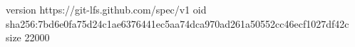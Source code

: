 version https://git-lfs.github.com/spec/v1
oid sha256:7bd6e0fa75d24c1ae6376441ec5aa74dca970ad261a50552cc46ecf1027df42c
size 22000
